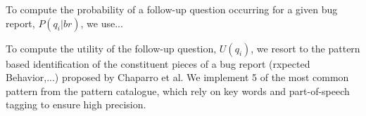 To compute the probability of a follow-up question occurring for a given bug report, $P(q_{i}|br)$, we use...

To compute the utility of the follow-up question, $U(q_{i})$, we resort to the pattern based
identification of the constituent pieces of a bug report (rxpected Behavior,...) proposed by Chaparro et al.
We implement 5 of the most common pattern from the pattern catalogue, which rely on key words
and part-of-speech tagging to ensure high precision.



%
%
%
